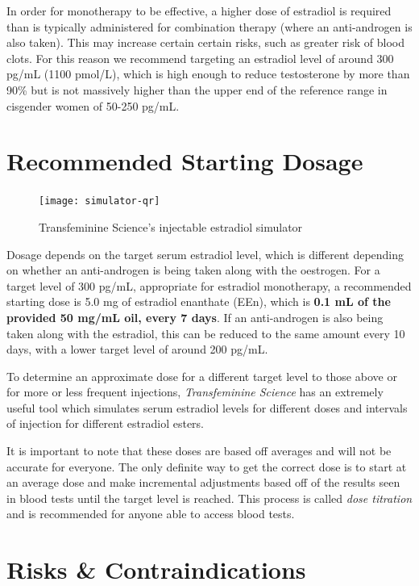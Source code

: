 \documentclass[twoside,a5paper]{article}
\begin{document}
In order for monotherapy to be effective, a higher dose of estradiol
is required than is typically administered for combination therapy
(where an anti-androgen is also taken).  This may increase certain
certain risks, such as greater risk of blood clots.  For this reason
we recommend targeting an estradiol level of around 300 pg/mL (1100
pmol/L), which is high enough to reduce testosterone by more than 90\%
but is not massively higher than the upper end of the reference range
in cisgender women of 50-250 pg/mL.

\section{Recommended Starting Dosage}

\begin{figure}
  \centering
  \texttt{[image: simulator-qr]}
  \caption{Transfeminine Science's injectable estradiol simulator}
  \label{fig:simulator-qr}
\end{figure}

Dosage depends on the target serum estradiol level, which is different
depending on whether an anti-androgen is being taken along with the
oestrogen.  For a target level of 300 pg/mL, appropriate for estradiol
monotherapy, a recommended starting dose is 5.0 mg of estradiol
enanthate (EEn), which is \textbf{0.1 mL of the provided 50 mg/mL oil,
  every 7 days}.  If an anti-androgen is also being taken along with
the estradiol, this can be reduced to the same amount every 10 days,
with a lower target level of around 200 pg/mL.

To determine an approximate dose for a different target level to those
above or for more or less frequent injections, \textit{Transfeminine
  Science} has an extremely useful tool which simulates serum
estradiol levels for different doses and intervals of injection for
different estradiol esters.

It is important to note that these doses are based off averages and
will not be accurate for everyone.  The only definite way to get the
correct dose is to start at an average dose and make incremental
adjustments based off of the results seen in blood tests until the
target level is reached.  This process is called \textit{dose
  titration} and is recommended for anyone able to access blood tests.

\section{Risks \& Contraindications}
\end{document}
